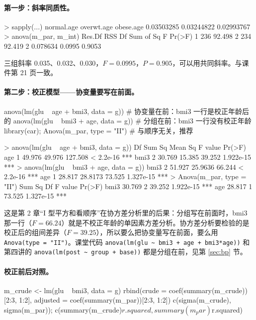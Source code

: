 \paragraph{第一步：斜率同质性。}
\begin{routput}
> sapply(...)
normal.age overwt.age  obese.age
0.03503285 0.03244822 0.02993767
> anova(m_par, m_int)
  Res.Df    RSS Df Sum of Sq      F Pr(>F)
1    236 92.498
2    234 92.419  2  0.078634 0.0995 0.9053
\end{routput}
三组斜率 0.035、0.032、0.030，$F=0.0995$，$P=0.905$，可以用共同斜率。与课件第 21 页一致。

\paragraph{第二步：校正模型——协变量要写在前面。}
\label{sec:ancova-order}
\begin{rcode}[R · 三种写法对比]
anova(lm(glu ~ age + bmi3, data = g))     # 协变量在前：bmi3 一行是校正年龄后的
anova(lm(glu ~ bmi3 + age, data = g))     # 分组在前：bmi3 一行没有校正年龄
library(car); Anova(m_par, type = "II")   # 与顺序无关，推荐
\end{rcode}
\begin{routput}
> anova(lm(glu ~ age + bmi3, data = g))
           Df Sum Sq Mean Sq F value    Pr(>F)
age         1 49.976  49.976 127.508 < 2.2e-16 ***
bmi3        2 30.769  15.385  39.252 1.922e-15 ***
> anova(lm(glu ~ bmi3 + age, data = g))
bmi3        2 51.927 25.9636  66.244 < 2.2e-16 ***
age         1 28.817 28.8173  73.525 1.327e-15 ***
> Anova(m_par, type = "II")
          Sum Sq  Df F value    Pr(>F)
bmi3      30.769   2  39.252 1.922e-15 ***
age       28.817   1  73.525 1.327e-15 ***
\end{routput}
这是第 2 章“I 型平方和看顺序”在协方差分析里的后果：分组写在前面时，bmi3 那一行（$F=66.24$）就是不校正年龄的单因素方差分析。协方差分析要检验的是校正后的组间差异（$F=39.25$），所以要么把协变量写在前面，要么用 \Verb|Anova(type = "II")|。课堂代码 \Verb|anova(lm(glu ~ bmi3 + age + bmi3*age))| 和第四讲的 \Verb|anova(lm(post ~ group + base))| 都是分组在前，见第 \ref{sec:bp} 节。

\paragraph{校正前后对照。}
\begin{rcode}[R · 粗差与校正差]
m_crude <- lm(glu ~ bmi3, data = g)
rbind(crude = coef(summary(m_crude))[2:3, 1:2], adjusted = coef(summary(m_par))[2:3, 1:2])
c(sigma(m_crude), sigma(m_par)); c(summary(m_crude)$r.squared, summary(m_par)$r.squared)
\end{rcode}


